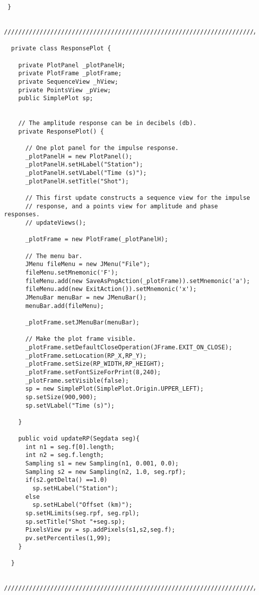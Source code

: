 \documentclass[11pt]{article}
\begin{document}
\begin{enumerate}
\begin{lstlisting}
 }

  ///////////////////////////////////////////////////////////////////////////

  private class ResponsePlot {

    private PlotPanel _plotPanelH;
    private PlotFrame _plotFrame;
    private SequenceView _hView;
    private PointsView _pView;
    public SimplePlot sp;
     
   
    // The amplitude response can be in decibels (db).
    private ResponsePlot() {

      // One plot panel for the impulse response.
      _plotPanelH = new PlotPanel();
      _plotPanelH.setHLabel("Station");
      _plotPanelH.setVLabel("Time (s)");
      _plotPanelH.setTitle("Shot");

      // This first update constructs a sequence view for the impulse 
      // response, and a points view for amplitude and phase responses.
      // updateViews();

      _plotFrame = new PlotFrame(_plotPanelH);

      // The menu bar.
      JMenu fileMenu = new JMenu("File");
      fileMenu.setMnemonic('F');
      fileMenu.add(new SaveAsPngAction(_plotFrame)).setMnemonic('a');
      fileMenu.add(new ExitAction()).setMnemonic('x');
      JMenuBar menuBar = new JMenuBar();
      menuBar.add(fileMenu);
      
      _plotFrame.setJMenuBar(menuBar);

      // Make the plot frame visible.
      _plotFrame.setDefaultCloseOperation(JFrame.EXIT_ON_CLOSE);
      _plotFrame.setLocation(RP_X,RP_Y);
      _plotFrame.setSize(RP_WIDTH,RP_HEIGHT);
      _plotFrame.setFontSizeForPrint(8,240);
      _plotFrame.setVisible(false);
      sp = new SimplePlot(SimplePlot.Origin.UPPER_LEFT);
      sp.setSize(900,900);
      sp.setVLabel("Time (s)");

    }

    public void updateRP(Segdata seg){
      int n1 = seg.f[0].length;
      int n2 = seg.f.length;
      Sampling s1 = new Sampling(n1, 0.001, 0.0);
      Sampling s2 = new Sampling(n2, 1.0, seg.rpf);
      if(s2.getDelta() ==1.0)
        sp.setHLabel("Station");
      else
        sp.setHLabel("Offset (km)");
      sp.setHLimits(seg.rpf, seg.rpl);
      sp.setTitle("Shot "+seg.sp);
      PixelsView pv = sp.addPixels(s1,s2,seg.f);
      pv.setPercentiles(1,99);
    }

  }

  ///////////////////////////////////////////////////////////////////////////


\end{lstlisting}
\end{enumerate}
\end{document}
